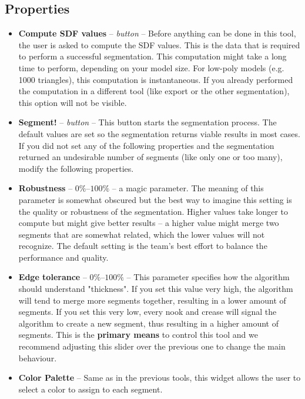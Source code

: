 \subsection{Properties}

\begin{itemize}

\item \textbf{Compute SDF values} -- \textit{button} -- Before anything can be done in this tool, the user is asked to compute the SDF values. This is the data that is required to perform a successful segmentation. This computation might take a long time to perform, depending on your model size. For low-poly models (e.g. 1000 triangles), this computation is instantaneous. If you already performed the computation in a different tool (like export or the other segmentation), this option will not be visible.

\item \textbf{Segment!} -- \textit{button} -- This button starts the segmentation process. The default values are set so the segmentation returns viable results in most cases. If you did not set any of the following properties and the segmentation returned an undesirable number of segments (like only one or too many), modify the following properties.

\item \textbf{Robustness} -- $0\%$--$100\%$ -- a magic parameter. The meaning of this parameter is somewhat obscured but the best way to imagine this setting is the quality or robustness of the segmentation. Higher values take longer to compute but might give better results -- a higher value might merge two segments that are somewhat related, which the lower values will not recognize. The default setting is the team's best effort to balance the performance and quality.

\item \textbf{Edge tolerance} -- $0\%$--$100\%$ -- This parameter specifies how the algorithm should understand "thickness". If you set this value very high, the algorithm will tend to merge more segments together, resulting in a lower amount of segments. If you set this very low, every nook and crease will signal the algorithm to create a new segment, thus resulting in a higher amount of segments. This is the \textbf{primary means} to control this tool and we recommend adjusting this slider over the previous one to change the main behaviour.

\item \textbf{Color Palette} -- Same as in the previous tools, this widget allows the user to select a color to assign to each segment.


\end{itemize}

